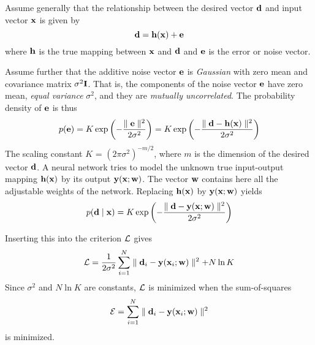 \begin{enumerate}
\begin{solution}
    Assume generally that the relationship between the desired vector
    ${\bf d}$ and input vector ${\bf x}$ is given by
    \[
    {\bf d} = {\bf h}({\bf x}) + {\bf e}
    \]
    where ${\bf h}$ is the true mapping between ${\bf x}$ and ${\bf d}$
    and ${\bf e}$ is the error or noise vector.


    Assume further that the additive noise vector ${\bf e}$ is
    {\em Gaussian} with zero mean and covariance matrix $\sigma^2 {\bf I}$.
    That is, the components of the noise vector ${\bf e}$ have zero mean,
    {\em equal variance} $\sigma^2$, and they are {\em mutually uncorrelated}.
    The probability density of ${\bf e}$ is thus
    \[
    p({\bf e}) = K \exp \left( -\frac{ \parallel {\bf e} \parallel^2 }{2\sigma^2}
    \right) = K \exp \left( -\frac{ \parallel {\bf d} - {\bf h}({\bf x})
        \parallel^2}{2\sigma^2} \right)
    \]
    The scaling constant $K$ = $(2\pi \sigma^2)^{-m/2}$, where $m$ is
    the dimension of the desired vector ${\bf d}$. A neural network tries to model the unknown true input-output
    mapping ${\bf h}({\bf x})$ by its output ${\bf y}({\bf x};{\bf w})$.
    The vector ${\bf w}$ contains here all the adjustable weights of the
    network.
    Replacing ${\bf h}({\bf x})$ by ${\bf y}({\bf x};{\bf w})$ yields
    \[
    p({\bf d} \mid {\bf x}) = K \exp \left( -\frac{ \parallel {\bf d}
        -{\bf y}({\bf x};{\bf w}) \parallel^2 }{2\sigma^2} \right)
    \]

    Inserting this into the criterion ${\cal L}$ gives
    \[
    {\cal L} = \frac{1}{2\sigma^2} \sum_{i=1}^N \parallel {\bf d}_i
    -{\bf y}({\bf x}_i;{\bf w}) \parallel^2 + N \ln K
    \]
    Since $\sigma^2$ and $N \ln K$ are constants, ${\cal L}$ is minimized
    when the sum-of-squares
    \[
    {\cal E} = \sum_{i=1}^N \parallel {\bf d}_i -{\bf y}({\bf x}_i;{\bf w}) \parallel^2
    \]
    is minimized.

  \end{solution}
  
\end{enumerate}


